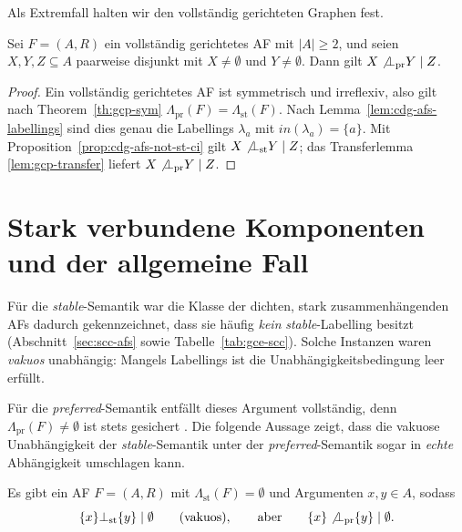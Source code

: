 Als Extremfall halten wir den vollst\"andig gerichteten Graphen fest.

\begin{Corollary}
    \label{cor:gcp-cdg}
    Sei \(F=(A,R)\) ein vollst\"andig gerichtetes AF mit \(|A|\geq 2\), und
    seien \(X,Y,Z\subseteq A\) paarweise disjunkt mit \(X\neq\emptyset\) und
    \(Y\neq\emptyset\). Dann gilt \(X\not\bot_{\mathrm{pr}}Y\mid Z\).
\end{Corollary}

\begin{proof}
    Ein vollst\"andig gerichtetes AF ist symmetrisch und irreflexiv, also gilt
    nach Theorem~\ref{th:gcp-sym} \(\Lambda_{\mathrm{pr}}(F)=
    \Lambda_{\mathrm{st}}(F)\). Nach Lemma~\ref{lem:cdg-afs-labellings} sind dies
    genau die Labellings \(\lambda_a\) mit \(\mathit{in}(\lambda_a)=\{a\}\).
    Mit Proposition~\ref{prop:cdg-afs-not-st-ci} gilt
    \(X\not\bot_{\mathrm{st}}Y\mid Z\); das Transferlemma
    \ref{lem:gcp-transfer} liefert \(X\not\bot_{\mathrm{pr}}Y\mid Z\).
\end{proof}

\section{Stark verbundene Komponenten und der allgemeine Fall}
\label{sec:gcp-scc}

F\"ur die \textit{stable}-Semantik war die Klasse der dichten, stark
zusammenh\"angenden AFs dadurch gekennzeichnet, dass sie h\"aufig \emph{kein}
\textit{stable}-Labelling besitzt (Abschnitt~\ref{sec:scc-afs} sowie
Tabelle~\ref{tab:gce-scc}). Solche Instanzen waren \emph{vakuos} unabh\"angig:
Mangels Labellings ist die Unabh\"angigkeitsbedingung leer erf\"ullt.

F\"ur die \textit{preferred}-Semantik entf\"allt dieses Argument
vollst\"andig, denn \(\Lambda_{\mathrm{pr}}(F)\neq\emptyset\) ist stets
gesichert \cite{dung:1995:af}. Die folgende Aussage zeigt, dass die
vakuose Unabh\"angigkeit der \textit{stable}-Semantik unter der
\textit{preferred}-Semantik sogar in \emph{echte} Abh\"angigkeit umschlagen
kann.

\begin{Proposition}
    \label{prop:gcp-vacuous-vs-dep}
    Es gibt ein AF \(F=(A,R)\) mit \(\Lambda_{\mathrm{st}}(F)=\emptyset\) und
    Argumenten \(x,y\in A\), sodass
    \[
        \{x\}\bot_{\mathrm{st}}\{y\}\mid\emptyset
        \qquad\text{(vakuos)},
        \qquad\text{aber}\qquad
        \{x\}\not\bot_{\mathrm{pr}}\{y\}\mid\emptyset.
    \]
\end{Proposition}

